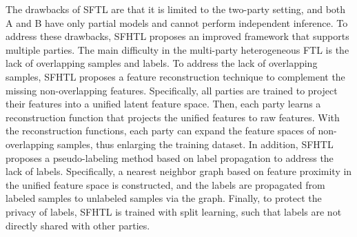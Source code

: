 \documentclass[11pt]{article}
\begin{document}
The drawbacks of SFTL are that it is limited to the two-party setting, and both A and B have only partial models and cannot perform independent inference. To address these drawbacks, SFHTL \cite{feng2022semi} proposes an improved framework that supports multiple parties. The main difficulty in the multi-party heterogeneous FTL is the lack of overlapping samples and labels. To address the lack of overlapping samples, SFHTL proposes a feature reconstruction technique to complement the missing non-overlapping features. Specifically, all parties are trained to project their features into a unified latent feature space. Then, each party learns a reconstruction function that projects the unified features to raw features. With the reconstruction functions, each party can expand the feature spaces of non-overlapping samples, thus enlarging the training dataset. In addition, SFHTL proposes a pseudo-labeling method based on label propagation \cite{zhu2005semi} to address the lack of labels. Specifically, a nearest neighbor graph based on feature proximity in the unified feature space is constructed, and the labels are propagated from labeled samples to unlabeled samples via the graph. Finally, to protect the privacy of labels, SFHTL is trained with split learning, such that labels are not directly shared with other parties. 
\end{document}
